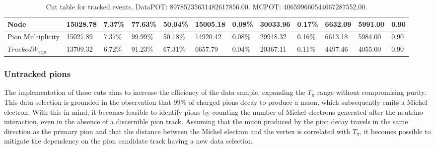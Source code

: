 \begin{table}
\begin{tabular}{|*{12}{l|}}
 Node   & 15028.78     &   7.37\% &  77.63\% &  50.04\% & 15005.18 &   0.08\% & 30033.96     &   0.17\% & 6632.09     & 5991.00 &   0.90 \\ \hline
 Pion Multiplicity   & 15027.89     &   7.37\% &  99.99\% &  50.18\% & 14920.42 &   0.08\% & 29948.32     &   0.16\% & 6613.18     & 5984.00 &   0.90 \\ \hline
 $Tracked W_{exp}$   & 13709.32     &   6.72\% &  91.23\% &  67.31\% & 6657.79 &   0.04\% & 20367.11     &   0.11\% & 4497.46     & 4055.00 &   0.90 \\ \hline
    \end{tabular}
    \caption{Cut table for tracked events. DataPOT: 89785235631482617856.00. MCPOT: 406599660544667287552.00.}
    \label{tab:Analysis:Cuts:TrackedCutTable}
\end{table}



\pagebreak

\subsubsection{Untracked pions}
\label{Cap:Analysis:DataSelection:Cuts:UntrackedPions}
The implementation of these cuts aims to increase the efficiency of the data sample, expanding the $T_\pi$ range without compromising purity. This data selection is grounded in the observation that 99\% of charged pions decay to produce a muon, which subsequently emits a Michel electron. With this in mind, it becomes feasible to identify pions by counting the number of Michel electrons generated after the neutrino interaction, even in the absence of a discernible pion track. Assuming that the muon produced by the pion decay travels in the same direction as the primary pion and that the distance between the Michel electron and the vertex is correlated with $T_\pi$, it becomes possible to mitigate the dependency on the pion candidate track having a new data selection. 

